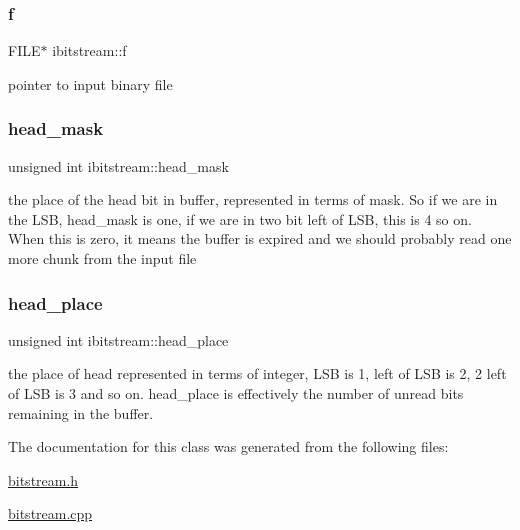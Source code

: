 \subsubsection{\texorpdfstring{f}{f}}
{\footnotesize\ttfamily F\+I\+LE$\ast$ ibitstream\+::f\hspace{0.3cm}{\ttfamily [private]}}



pointer to input binary file 

\mbox{\label{classibitstream_a48cd41991b6c29ea5120b53873a72a70}} 
\subsubsection{\texorpdfstring{head\+\_\+mask}{head\_mask}}
{\footnotesize\ttfamily unsigned int ibitstream\+::head\+\_\+mask\hspace{0.3cm}{\ttfamily [private]}}



the place of the head bit in buffer, represented in terms of mask. So if we are in the L\+SB, head\+\_\+mask is one, if we are in two bit left of L\+SB, this is 4 so on. When this is zero, it means the buffer is expired and we should probably read one more chunk from the input file 

\mbox{\label{classibitstream_a7b96359ac1534a5565e6e9b0cc53a0b3}} 
\subsubsection{\texorpdfstring{head\+\_\+place}{head\_place}}
{\footnotesize\ttfamily unsigned int ibitstream\+::head\+\_\+place\hspace{0.3cm}{\ttfamily [private]}}



the place of head represented in terms of integer, L\+SB is 1, left of L\+SB is 2, 2 left of L\+SB is 3 and so on. head\+\_\+place is effectively the number of unread bits remaining in the buffer. 



The documentation for this class was generated from the following files\+:\begin{DoxyCompactItemize}
\item 
\hyperlink{bitstream_8h}{bitstream.\+h}\item 
\hyperlink{bitstream_8cpp}{bitstream.\+cpp}\end{DoxyCompactItemize}
